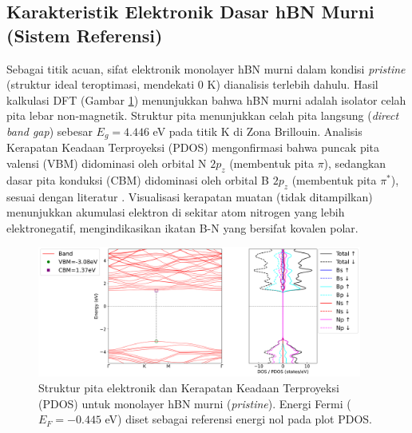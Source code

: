 \subsection{Karakteristik Elektronik Dasar hBN Murni (Sistem Referensi)}
\label{subsec:hbn_murni_dasar}
Sebagai titik acuan, sifat elektronik monolayer hBN murni dalam kondisi \emph{pristine} (struktur ideal teroptimasi, mendekati 0 K) dianalisis terlebih dahulu.
Hasil kalkulasi DFT (Gambar \ref{fig:hbn_pristine_bs_pdos}) menunjukkan bahwa hBN murni adalah isolator celah pita lebar non-magnetik.
Struktur pita menunjukkan celah pita langsung (\emph{direct band gap}) sebesar $E_g = 4.446$ eV pada titik K di Zona Brillouin.
Analisis Kerapatan Keadaan Terproyeksi (PDOS) mengonfirmasi bahwa puncak pita valensi (VBM) didominasi oleh orbital N $2p_z$ (membentuk pita $\pi$), sedangkan dasar pita konduksi (CBM) didominasi oleh orbital B $2p_z$ (membentuk pita $\pi^*$), sesuai dengan literatur \citep{Sachs2011}.
Visualisasi kerapatan muatan (tidak ditampilkan) menunjukkan akumulasi elektron di sekitar atom nitrogen yang lebih elektronegatif, mengindikasikan ikatan B-N yang bersifat kovalen polar.
\begin{figure}[htbp!] %
    \centering
    \includegraphics[width=0.95\textwidth]{gambar_hasil/simple_bands_pdos_pristine.png}
    \caption{Struktur pita elektronik dan Kerapatan Keadaan Terproyeksi (PDOS) untuk monolayer hBN murni (\emph{pristine}).
Energi Fermi ($E_F = -0.445$ eV) diset sebagai referensi energi nol pada plot PDOS.}
    \label{fig:hbn_pristine_bs_pdos}
\end{figure}

